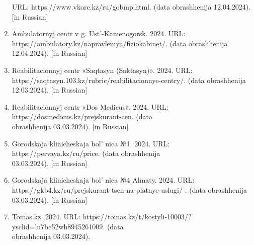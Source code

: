 \begin{references}
\begin{enumerate}
  URL: https://www.vkorc.kz/ru/gobmp.html. (data
  obrashhenija 12.04.2024). {[}in Russian{]}
\item
  Ambulatornyj centr v g. Ust'-Kamenogorsk. 2024. URL:
  https://ambulatory.kz/napravleniya/fiziokabinet/. (data obrashhenija
  12.04.2024). {[}in Russian{]}
\item
  Reabilitacionnyj centr «Saqtasyn (Saktasyn)». 2024. URL:
  https://saqtasyn.103.kz/rubric/reabilitacionnye-centry/. (data
  obrashhenija 12.03.2024). {[}in Russian{]}
\item
  Reabilitacionnyj centr «Dos Medicus». 2024. URL:
  https://dosmedicus.kz/prejskurant-cen. (data \\obrashhenija 03.03.2024).
  {[}in Russian{]}
\item
  Gorodskaja klinicheskaja bol' nica №1. 2024. URL:
  https://pervaya.kz/ru/price. (data obrashhenija \\03.03.2024). {[}in
  Russian{]}
\item
  Gorodskaja klinicheskaja bol' nica №4 Almaty. 2024.
  URL: https://gkb4.kz/ru/prejskurant-tsen-na-platnye-uslugi/ . (data
  obrashhenija 03.03.2024). {[}in Russian{]}
\item
  Tomas.kz. 2024. URL:
  https://tomas.kz/t/kostyli-10003/?ysclid=lu7be52wh8945261009. (data
  \\obrashhenija 03.03.2024).
\end{enumerate}
\end{references}
